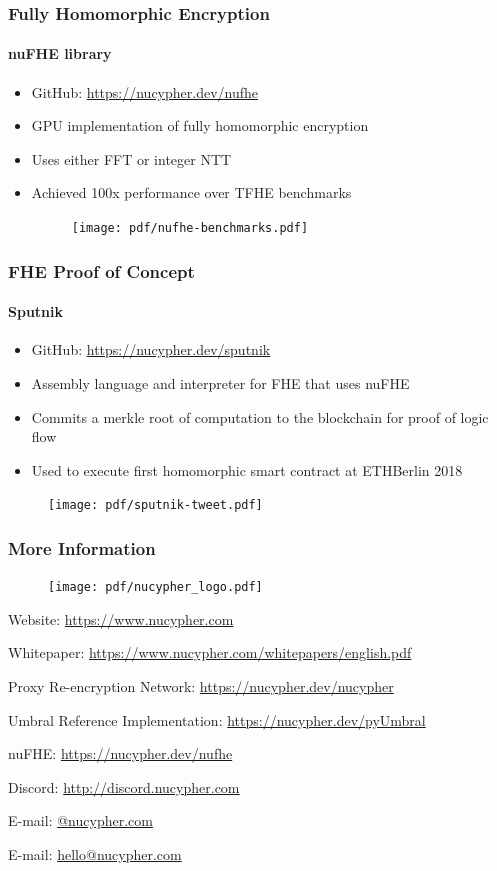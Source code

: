 \documentclass[xetex,mathsans,sans,aspectratio=169]{beamer}
\begin{document}
    \begin{frame}
      \frametitle{Fully Homomorphic Encryption}
       \framesubtitle{nuFHE library}
       \begin{itemize}
           \item GitHub: \url{https://nucypher.dev/nufhe}
           \item GPU implementation of fully homomorphic encryption
           \item Uses either FFT or integer NTT
           \item Achieved 100x performance over TFHE benchmarks
           \begin{figure}
               \texttt{[image: pdf/nufhe-benchmarks.pdf]}
           \end{figure}
       \end{itemize}
     \end{frame}

    \begin{frame}
      \frametitle{FHE Proof of Concept}
      \framesubtitle{Sputnik}
      \begin{itemize}
        \item GitHub: \url{https://nucypher.dev/sputnik}
        \item Assembly language and interpreter for FHE that uses nuFHE
        \item Commits a merkle root of computation to the blockchain for proof of logic flow
        \item Used to execute first homomorphic smart contract at ETHBerlin 2018
      \end{itemize}
      \begin{figure}
        \centering
        \texttt{[image: pdf/sputnik-tweet.pdf]}
      \end{figure}
    \end{frame}

    \begin{frame}
        \frametitle{More Information}
        \begin{figure}
            \centering
            \texttt{[image: pdf/nucypher\_logo.pdf]}
        \end{figure}
        Website: \url{https://www.nucypher.com}

        Whitepaper: \url{https://www.nucypher.com/whitepapers/english.pdf}

        Proxy Re-encryption Network: \url{https://nucypher.dev/nucypher}

        Umbral Reference Implementation: \url{https://nucypher.dev/pyUmbral}

        nuFHE: \url{https://nucypher.dev/nufhe}

        Discord: \url{http://discord.nucypher.com}

        E-mail: \href{mailto:\emailname @nucypher.com}{\emailname @nucypher.com}

        E-mail: \href{mailto:hello@nucypher.com}{hello@nucypher.com}
    \end{frame}
\end{document}
